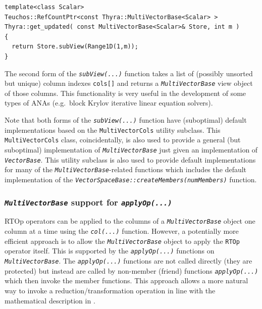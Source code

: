 \documentclass[pdf,ps2pdf,11pt]{SANDreport}
\begin{document}
{\scriptsize\begin{verbatim}
template<class Scalar>
Teuchos::RefCountPtr<const Thyra::MultiVectorBase<Scalar> >
Thyra::get_updated( const MultiVectorBase<Scalar>& Store, int m )
{
  return Store.subView(Range1D(1,m));
}
\end{verbatim}}

The second form of the {}\texttt{\textit{subView(...)}} function takes a
list of (possibly unsorted but unique) column indexes
{}\texttt{cols[]} and returns a {}\texttt{\textit{Multi\-Vector\-Base}} view
object of those columns.  This functionality is very useful in the
development of some types of ANAs (e.g.~block Krylov iterative linear
equation solvers).

Note that both forms of the {}\texttt{\textit{subView(...)}} function
have (suboptimal) default implementations based on the
{}\texttt{MultiVectorCols} utility subclass.  This
{}\texttt{MultiVectorCols} class, coincidentally, is also used to
provide a general (but suboptimal) implementation of
{}\texttt{\textit{Multi\-Vector\-Base}} just given an implementation of
{}\texttt{\textit{Vector\-Base}}.  This utility subclass is also used to
provide default implementations for many of the
{}\texttt{\textit{Multi\-Vector\-Base}}-related functions which includes the
default implementation of the
{}\texttt{\textit{Vector\-Space\-Base\-::createMembers(numMembers)}} function.

%
\subsubsection{\texttt{\textit{Multi\-Vector\-Base}} support for {}\texttt{\textit{applyOp(\-...)}}}
\label{tsfcore:sec:multi_vec_apply_op}
%

RTOp operators can be applied to the columns of a
{}\texttt{\textit{Multi\-Vector\-Base}} object one column at a time using
the {}\texttt{\textit{col(...)}} function.  However, a potentially more
efficient approach is to allow the {}\texttt{\textit{Multi\-Vector\-Base}}
object to apply the {}\texttt{RTOp} operator itself.  This is
supported by the {}\texttt{\textit{applyOp(\-...)}} functions on
{}\texttt{\textit{Multi\-Vector\-Base}}.  The
{}\texttt{\textit{applyOp(\-...)}} functions are not called directly
(they are protected) but instead are called by non-member (friend)
functions {}\texttt{\textit{applyOp(\-...)}} which then invoke the
member functions.  This approach allows a more natural way to invoke a
reduction/transformation operation in line with the mathematical
description in {}\cite{ref:rtop_toms}.
\end{document}
